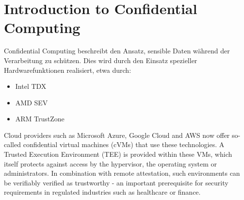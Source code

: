 \section{Introduction to Confidential Computing}

Confidential Computing beschreibt den Ansatz, sensible Daten während der Verarbeitung zu schützen. Dies wird durch den Einsatz spezieller Hardwarefunktionen realisiert, etwa durch:

\begin{itemize}
  \item Intel TDX
  \item AMD SEV
  \item ARM TrustZone
\end{itemize}

Cloud providers such as Microsoft Azure, Google Cloud and AWS now offer so-called confidential virtual machines (cVMs) that use these technologies. A Trusted Execution Environment (TEE) is provided within these VMs, which itself protects against access by the hypervisor, the operating system or administrators. In combination with remote attestation, such environments can be verifiably verified as trustworthy - an important prerequisite for security requirements in regulated industries such as healthcare or finance.

